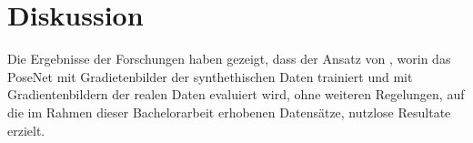 
\section{Diskussion}
\label{sec:kapitel_5}
Die Ergebnisse der Forschungen haben gezeigt, dass der Ansatz von \citet{acharyaBIMPoseNetIndoorCamera2019}, worin das PoseNet mit Gradietenbilder der synthethischen Daten trainiert und mit Gradientenbildern der realen Daten evaluiert wird,  ohne weiteren Regelungen, auf die im Rahmen dieser Bachelorarbeit erhobenen Datensätze, nutzlose Resultate erzielt.